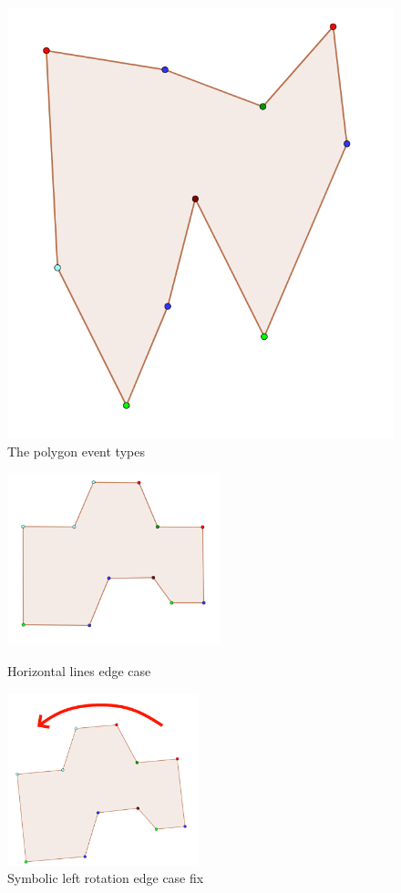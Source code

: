 \documentclass[12pt]{article}
\begin{document}
\begin{figure}[H]
  \centering
  \includegraphics[width=0.5\linewidth]{Images/intersection_eventAssignment.png}
  \caption{The polygon event types}
  \label{fig:intersectionEventTypes}
\end{figure}
\begin{figure}[H]
  \centering
  \includegraphics[height=5cm]{Images/intersection_eventAssignmentEdgeCase.png}
  \caption{Horizontal lines edge case}
  \label{fig:intersectionHorizontalLines}
\endminipage\hfill
{}
  \centering
  \includegraphics[height=5cm]{Images/intersection_eventAssignmentEdgeCaseRotated.png}
  \caption{Symbolic left rotation edge case fix}
  \label{fig:intersectionHorizontalLinesRotated}
\endminipage
\end{figure}
\end{document}
